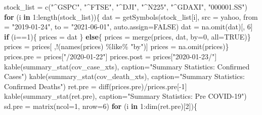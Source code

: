 \documentclass[
  11pt,
]{article}
\newenvironment{Shaded}{\begin{snugshade}}{\end{snugshade}}
\newcommand{\AttributeTok}[1]{\textcolor[rgb]{0.77,0.63,0.00}{#1}}
\newcommand{\ConstantTok}[1]{\textcolor[rgb]{0.00,0.00,0.00}{#1}}
\newcommand{\ControlFlowTok}[1]{\textcolor[rgb]{0.13,0.29,0.53}{\textbf{#1}}}
\newcommand{\DecValTok}[1]{\textcolor[rgb]{0.00,0.00,0.81}{#1}}
\newcommand{\FunctionTok}[1]{\textcolor[rgb]{0.00,0.00,0.00}{#1}}
\newcommand{\NormalTok}[1]{#1}
\newcommand{\OtherTok}[1]{\textcolor[rgb]{0.56,0.35,0.01}{#1}}
\newcommand{\SpecialCharTok}[1]{\textcolor[rgb]{0.00,0.00,0.00}{#1}}
\newcommand{\StringTok}[1]{\textcolor[rgb]{0.31,0.60,0.02}{#1}}
\begin{document}
\begin{Shaded}
\begin{Highlighting}[]
\NormalTok{stock\_list }\OtherTok{=} \FunctionTok{c}\NormalTok{(}\StringTok{"\^{}GSPC"}\NormalTok{, }\StringTok{"\^{}FTSE"}\NormalTok{, }\StringTok{"\^{}DJI"}\NormalTok{, }\StringTok{"\^{}N225"}\NormalTok{, }\StringTok{"\^{}GDAXI"}\NormalTok{, }\StringTok{"000001.SS"}\NormalTok{)}
\ControlFlowTok{for}\NormalTok{ (i }\ControlFlowTok{in} \DecValTok{1}\SpecialCharTok{:}\FunctionTok{length}\NormalTok{(stock\_list))\{}
\NormalTok{    dat }\OtherTok{=} \FunctionTok{getSymbols}\NormalTok{(stock\_list[i], }\AttributeTok{src =} \StringTok{\textquotesingle{}yahoo\textquotesingle{}}\NormalTok{, }\AttributeTok{from =} \StringTok{"2019{-}01{-}24"}\NormalTok{, }\AttributeTok{to =} \StringTok{"2021{-}06{-}01"}\NormalTok{, }\AttributeTok{auto.assign=}\ConstantTok{FALSE}\NormalTok{)}
\NormalTok{    dat }\OtherTok{=} \FunctionTok{na.omit}\NormalTok{(dat)[, }\DecValTok{6}\NormalTok{]}
    \ControlFlowTok{if}\NormalTok{ (i}\SpecialCharTok{==}\DecValTok{1}\NormalTok{)\{}
\NormalTok{      prices }\OtherTok{=}\NormalTok{ dat}
\NormalTok{    \} }\ControlFlowTok{else}\NormalTok{\{}
\NormalTok{      prices }\OtherTok{=} \FunctionTok{merge}\NormalTok{(prices, dat, }\AttributeTok{by=}\DecValTok{0}\NormalTok{, }\AttributeTok{all=}\ConstantTok{TRUE}\NormalTok{)\}}
\NormalTok{    prices }\OtherTok{=}\NormalTok{ prices[ ,}\SpecialCharTok{!}\NormalTok{(}\FunctionTok{names}\NormalTok{(prices) }\SpecialCharTok{\%like\%} \StringTok{"by"}\NormalTok{)]}
\NormalTok{    prices }\OtherTok{=} \FunctionTok{na.omit}\NormalTok{(prices)\}}
\NormalTok{prices.pre }\OtherTok{=}\NormalTok{ prices[}\StringTok{"/2020{-}01{-}22"}\NormalTok{]}
\NormalTok{prices.post }\OtherTok{=}\NormalTok{ prices[}\StringTok{"2020{-}01{-}23/"}\NormalTok{]}
\FunctionTok{kable}\NormalTok{(}\FunctionTok{summary\_stat}\NormalTok{(cov\_case\_xts), }\AttributeTok{caption=}\StringTok{"Summary Statistics: Confirmed Cases"}\NormalTok{)}
\FunctionTok{kable}\NormalTok{(}\FunctionTok{summary\_stat}\NormalTok{(cov\_death\_xts), }\AttributeTok{caption=}\StringTok{"Summary Statistics: Confirmed Deaths"}\NormalTok{)}
\NormalTok{ret.pre }\OtherTok{=} \FunctionTok{diff}\NormalTok{(prices.pre)}\SpecialCharTok{/}\NormalTok{prices.pre[}\SpecialCharTok{{-}}\DecValTok{1}\NormalTok{]}
\FunctionTok{kable}\NormalTok{(}\FunctionTok{summary\_stat}\NormalTok{(ret.pre), }\AttributeTok{caption=}\StringTok{"Summary Statistics: Pre COVID{-}19"}\NormalTok{)}
\NormalTok{sd.pre }\OtherTok{=} \FunctionTok{matrix}\NormalTok{(}\AttributeTok{ncol=}\DecValTok{1}\NormalTok{, }\AttributeTok{nrow=}\DecValTok{6}\NormalTok{)}
\ControlFlowTok{for}\NormalTok{ (i }\ControlFlowTok{in} \DecValTok{1}\SpecialCharTok{:}\FunctionTok{dim}\NormalTok{(ret.pre)[}\DecValTok{2}\NormalTok{])\{}

\end{Highlighting}
\end{Shaded}
\end{document}
